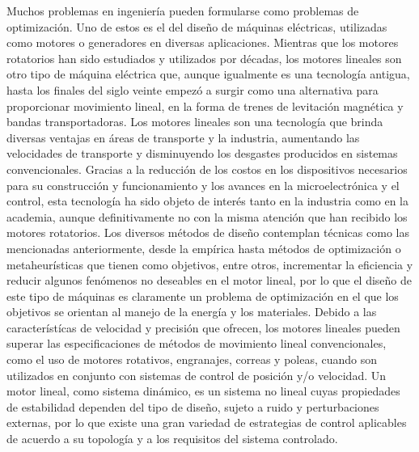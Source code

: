Muchos problemas en ingeniería pueden formularse como problemas de optimización. Uno de estos es el del diseño de máquinas eléctricas, utilizadas como motores o generadores en diversas aplicaciones. Mientras que los motores rotatorios han sido estudiados y utilizados por décadas, los motores lineales son otro tipo de máquina eléctrica que, aunque igualmente es una tecnología antigua, hasta los finales del siglo veinte empezó a surgir como una alternativa para proporcionar movimiento lineal, en la forma de trenes de levitación magnética y bandas transportadoras. Los motores lineales son una tecnología que brinda diversas ventajas en áreas de transporte y la industria, aumentando las velocidades de transporte y disminuyendo los desgastes producidos en sistemas convencionales.  Gracias a la reducción de los costos en los dispositivos necesarios para su construcción y funcionamiento y los avances en la microelectrónica y el control, esta tecnología ha sido objeto de interés tanto en la industria como en la academia, aunque definitivamente no con la misma atención que han recibido los motores rotatorios. Los diversos métodos de diseño contemplan técnicas como las mencionadas anteriormente, desde la empírica hasta métodos de optimización o metaheurísticas que tienen como objetivos, entre otros, incrementar la eficiencia y reducir algunos fenómenos no deseables en el motor lineal, por lo que el diseño de este tipo de máquinas es claramente un problema de optimización en el que los objetivos se orientan al manejo de la energía y los materiales. 
Debido a las característícas de velocidad y precisión que ofrecen, los motores lineales pueden superar las especificaciones de métodos de movimiento lineal convencionales, como el uso de motores rotativos, engranajes, correas y poleas, cuando son utilizados en conjunto con sistemas de control de posición y/o velocidad. Un motor lineal, como sistema dinámico, es un sistema no lineal cuyas propiedades de estabilidad dependen del tipo de diseño, sujeto a ruido y perturbaciones externas, por lo que existe una gran variedad de estrategias de control aplicables de acuerdo a su topología y a los requisitos del sistema controlado.

